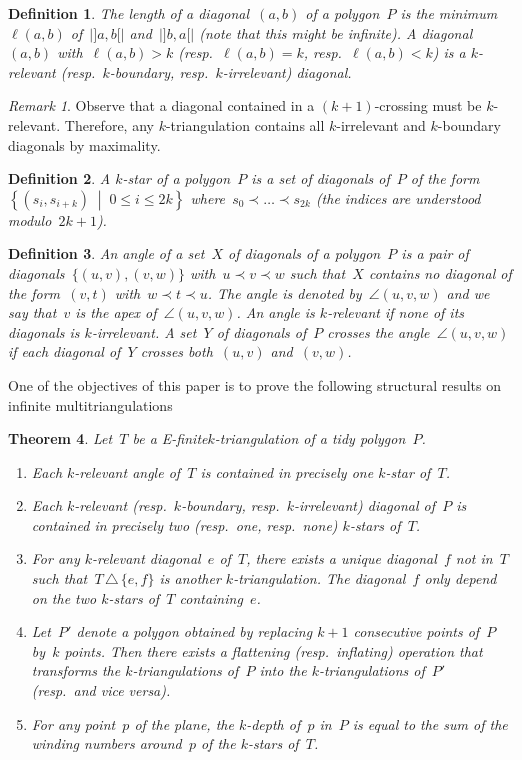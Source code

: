 \documentclass{amsart}
\newtheorem{theorem}{Theorem}[section]
\newtheorem{definition}[theorem]{Definition}
\theoremstyle{remark}
\newtheorem{remark}{Remark}[section]
\newcommand{\darkblue}{\color{darkblue}} %
\newcommand{\defn}[1]{\textsl{\darkblue #1}} %
\newcommand*{\ef}[0]{E-finite\xspace}
\newcommand*{\ktg}[0]{$k$-triangulation\xspace}
\newcommand{\cl}{\prec}
\newcommand{\set}[2]{\left\{ #1 \;\middle|\; #2 \right\}} %
\newcommand{\symdif}{\,\triangle\,} %
\newcommand{\viceversa}{\textit{vice versa}} %
\newcommand{\vincent}[1]{\todo[color=blue!30]{#1 \\ \hfill --- V.}}
\begin{document}
\begin{definition}
The \defn{length} of a diagonal~$(a,b)$ of a polygon~$P$ is the minimum~$\ell(a,b)$ of~$|{]a,b[}|$ and~$|{]b,a[}|$ (note that this might be infinite).
A diagonal~$(a,b)$ with~$\ell(a,b) > k$ (resp.~$\ell(a,b) = k$, resp.~$\ell(a,b) < k$) is a \defn{$k$-relevant} (resp.~\defn{$k$-boundary}, resp.~\defn{$k$-irrelevant}) diagonal.
\end{definition}

\begin{remark}
Observe that a diagonal contained in a $(k+1)$-crossing must be $k$-relevant.
Therefore, any \ktg contains all $k$-irrelevant and $k$-boundary diagonals by maximality.
\end{remark}


\begin{definition}
A \defn{$k$-star} of a polygon~$P$ is a set of diagonals of~$P$ of the form~$\set{(s_i, s_{i+k})}{0 \le i \le 2k}$ where~$s_0 \cl \dots \cl s_{2k}$ (the indices are understood modulo~$2k+1$).
\end{definition}

\begin{definition}
An \defn{angle} of a set~$X$ of diagonals of a polygon~$P$ is a pair of diagonals~$\{(u,v), (v,w)\}$ with~$u \cl v \cl w$ such that~$X$ contains no diagonal of the form~$(v,t)$ with~$w \cl t \cl u$. The angle is denoted by~$\angle(u,v,w)$ and we say that~$v$ is the \defn{apex} of~$\angle(u,v,w)$. An angle is \defn{$k$-relevant} if none of its diagonals is $k$-irrelevant. A set~$Y$ of diagonals of~$P$ crosses the angle~$\angle(u,v,w)$ if each diagonal of~$Y$ crosses both~$(u,v)$ and~$(v,w)$.
\end{definition}

One of the objectives of this paper is to prove the following structural results on infinite multitriangulations

\begin{theorem}
\label{thm:structureInfinite}
Let~$T$ be a \ef \ktg of a tidy polygon~$P$.
\begin{enumerate}
\item Each $k$-relevant angle of~$T$ is contained in precisely one $k$-star of~$T$.
\item Each $k$-relevant (resp.~$k$-boundary, resp.~$k$-irrelevant) diagonal of~$P$ is contained in precisely two (resp.~one, resp.~none) $k$-stars of~$T$.
\item For any $k$-relevant diagonal~$e$ of~$T$, there exists a unique diagonal~$f$ not in~$T$ such that~$T \symdif \{e,f\}$ is another $k$-triangulation. The diagonal~$f$ only depend on the two $k$-stars of~$T$ containing~$e$.
\item Let~$P'$ denote a polygon obtained by replacing $k+1$ consecutive points of~$P$ by~$k$ points. Then there exists a flattening (resp.~inflating) operation that transforms the \ktg{}s of~$P$ into the \ktg{}s of~$P'$ (resp.~and \viceversa).
\item For any point~$p$ of the plane, the $k$-depth of~$p$ in~$P$ is equal to the sum of the winding numbers around~$p$ of the $k$-stars of~$T$.
\vincent{Vrai ?}
\end{enumerate}
\end{theorem}
\end{document}
